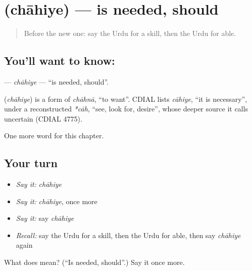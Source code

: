 \section[\texorpdfstring{\ur{چاہیے} (chāhiye)}{چاہیے (chāhiye)}]{ (chāhiye) — is needed, should}

\label{lesson:UR-C104-chahiye}



\begin{quote}
Before the new one: say the Urdu for a skill, then the Urdu for able.
\end{quote}

\subsection*{You'll want to know: }
\textbf{} — \emph{chāhiye} — \textquotedblleft{}is needed, should\textquotedblright{}.

\begin{cousinweb}
\textbf{} (\emph{chāhiye}) is a form of \emph{chāhnā}, \textquotedblleft{}to want\textquotedblright{}. CDIAL lists \emph{cāhiye}, \textquotedblleft{}it is necessary\textquotedblright{}, under a reconstructed \emph{*cāh}, \textquotedblleft{}see, look for, desire\textquotedblright{}, whose deeper source it calls uncertain (CDIAL 4775).
\end{cousinweb}

\begin{grammarlens}[title={What you've built}]
One more word for this chapter.
\end{grammarlens}

\subsection*{Your turn}
\begin{itemize}
\raggedright
  \item \emph{Say it:} \emph{chāhiye}
  \item \emph{Say it:} \emph{chāhiye}, once more
  \item \emph{Say it:} say \emph{chāhiye}
  \item \emph{Recall:} say the Urdu for a skill, then the Urdu for able, then say \emph{chāhiye} again
\end{itemize}

\begin{tcolorbox}[breakable,colback=teal!4,colframe=teal!35!black,title={Before you move on}]
What does  mean? (\textquotedblleft{}Is needed, should\textquotedblright{}.) Say it once more.
\end{tcolorbox}
